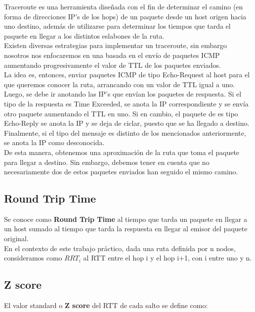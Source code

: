 \indent \indent Traceroute es una herramienta diseñada con el fin de determinar el camino (en forma de direcciones IP's de los hops) de un paquete desde un host origen hacia uno destino, además de utilizarse para determinar los tiempos que tarda el paquete en llegar a los distintos eslabones de la ruta.\\
\indent Existen diversas estrategias para implementar un traceroute, sin embargo nosotros nos enfocaremos en una basada en el envío de paquetes ICMP aumentando progresivamente el valor de TTL de los paquetes enviados.\\
\indent La idea es, entonces, enviar paquetes ICMP de tipo Echo-Request al host para el que queremos conocer la ruta, arrancando con un valor de TTL igual a uno. Luego, se debe ir anotando las IP's que envían los paquetes de respuesta. Si el tipo de la respuesta es Time Exceeded, se anota la IP correspondiente y se envía otro paquete aumentando el TTL en uno. Si en cambio, el paquete de es tipo Echo-Reply se anota la IP y se deja de ciclar, puesto que se ha llegado a destino. Finalmente, si el tipo del mensaje es distinto de los mencionados anteriormente, se anota la IP como desconocida.\\
\indent De esta manera, obtenemos una aproximación de la ruta que toma el paquete para llegar a destino. Sin embargo, debemos tener en cuenta que no necesariamente dos de estos paquetes enviados han seguido el mismo camino.\\

\subsection{Round Trip Time}

\indent \indent Se conoce como \textbf{Round Trip Time} al tiempo que tarda un paquete en llegar a un host sumado al tiempo que tarda la respuesta en llegar al emisor del paquete original.\\
\indent En el contexto de este trabajo práctico, dada una ruta definida por n nodos, consideramos como $RRT_i$ al RTT entre el hop i y el hop i+1, con i entre uno y n.\\

\subsection{Z score}

\indent \indent El valor standard o \textbf{Z score} del RTT de cada salto se define como:\newline


